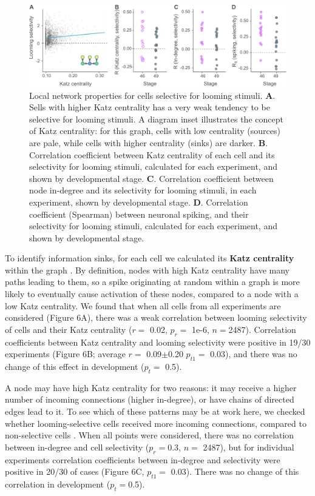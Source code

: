 \documentclass{article}
\begin{document}
\begin{figure}[t!]
\includegraphics[width=\linewidth]{fig6.pdf}
\caption{
Local network properties for cells selective for looming stimuli. \textbf{A}. Sells with higher Katz centrality has a very weak tendency to be selective for looming stimuli. A diagram inset illustrates the concept of Katz centrality: for this graph, cells with low centrality (sources) are pale, while cells with higher centrality (sinks) are darker. \textbf{B}. Correlation coefficient between Katz centrality of each cell and its selectivity for looming stimuli, calculated for each experiment, and shown by developmental stage. \textbf{C}. Correlation coefficient between node in-degree and its selectivity for looming stimuli, in each experiment, shown by developmental stage. \textbf{D}. Correlation coefficient (Spearman) between neuronal spiking, and their selectivity for looming stimuli, calculated for each experiment, and shown by developmental stage. }
\end{figure}

To identify information sinks, for each cell we calculated its \textbf{Katz centrality} within the graph \citep{katz1953original,fletcher2018katz}. By definition, nodes with high Katz centrality have many paths leading to them, so a spike originating at random within a graph is more likely to eventually cause activation of these nodes, compared to a node with a low Katz centrality. We found that when all cells from all experiments are considered (Figure 6A), there was a weak correlation between looming selectivity of cells and their Katz centrality ($r =$ 0.02, $p_{r} =$ 1e-6, $n=$2487). Correlation coefficients between Katz centrality and looming selectivity were positive in 19/30 experiments (Figure 6B; average $r=$ 0.09$\pm$0.20 $p_{t1}=$ 0.03), and there was no change of this effect in development ($p_t=$ 0.5).

A node may have high Katz centrality for two reasons: it may receive a higher number of incoming connections (higher in-degree), or have chains of directed edges lead to it. To see which of these patterns may be at work here, we checked whether looming-selective cells received more incoming connections, compared to non-selective cells \citep{litwin2014assemblies}. When all points were considered, there was no correlation between in-degree and cell selectivity ($p_{r}=$0.3, $n=$ 2487), but for individual experiments correlation coefficients between in-degree and selectivity were positive in 20/30 of cases (Figure 6C, $p_{t1}=$ 0.03). There was no change of this correlation in development ($p_t=$0.5).
\end{document}
